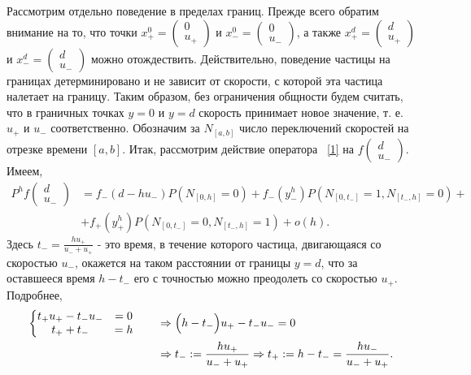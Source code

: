 \documentclass[12pt,a4paper]{article}
\begin{document}
Рассмотрим отдельно поведение в пределах границ.
Прежде всего обратим внимание на то, что точки $x^0_+ = 
\begin{pmatrix}
 0 \\
 u_+
\end{pmatrix}$ и $x^0_- = 
\begin{pmatrix}
 0 \\
 u_-
\end{pmatrix}$, а также $x^d_+ = 
\begin{pmatrix}
 d \\
 u_+
\end{pmatrix}$ и $x^d_- = 
\begin{pmatrix}
 d \\
 u_-
\end{pmatrix}
$ можно отождествить. Действительно, поведение частицы на границах детерминировано и не зависит от скорости, с которой эта частица налетает на границу. Таким образом, без ограничения общности будем считать, что в граничных точках $y = 0$ и $y = d$ скорость принимает новое значение, т. е. $u_+$ и $u_-$ соответственно. Обозначим за $N_{[a, b]}$ число переключений скоростей на отрезке времени $[a, b]$. Итак, рассмотрим действие оператора ~\eqref{1} на $f \begin{pmatrix}
 d \\
 u_-
\end{pmatrix}$. Имеем,
\begin{equation*}
    \begin{aligned}
  P^h f \begin{pmatrix}
 d \\
 u_-
\end{pmatrix} &= f_- (d - h u_-) P (N_{[0, h]} = 0) + f_-(y^h_-) P (N_{[0, t_-]} = 1, N_{[t_-, h]} = 0) +\\
&+ f_+(y^h_+) P (N_{[0, t_-]} = 0, N_{[t_-, h]} = 1) + o(h).      
    \end{aligned}
\end{equation*}
Здесь $t_- = \displaystyle\frac{h u_+}{u_- + u_+}$ - это время, в течение которого частица, двигающаяся со скоростью $u_-$, окажется на таком расстоянии от границы $y = d$, что за оставшееся время $h - t_-$ его с точностью можно преодолеть со скоростью $u_+$. Подробнее,
\begin{equation*}
\begin{aligned}
\left\{\begin{matrix}
 t_+ u_+ - t_- u_- &= 0 \\
 t_+ + t_- &= h
\end{matrix}
\right. \qquad
&\Rightarrow \Bigl( h - t_-\Bigr) u_+ - t_- u_- = 0\\
&\Rightarrow t_- := \frac{h u_+}{u_- + u_+} \Rightarrow t_+ : = h - t_- = \frac{h u_-}{u_- + u_+}.
\end{aligned}
\end{equation*}
\end{document}
